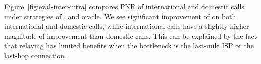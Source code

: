 
 Figure~\ref{fig:eval-inter-intra} compares PNR of international and domestic calls under strategies of \direct, \hybrid and oracle.%
We see significant improvement of \hybrid on both international and domestic calls, while international calls have a slightly higher magnitude of improvement than domestic calls. 
This can be explained by the fact that relaying has limited benefits when the bottleneck is the last-mile ISP or the last-hop connection.



